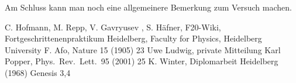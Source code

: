 \documentclass[12pt, a4paper]{article}
\begin{document}
Am Schluss kann man noch eine allgemeinere Bemerkung zum Versuch machen.


\newpage 


\begin{thebibliography}{00}   %
 C. Hofmann, M. Repp, V. Gavryusev , S. H\"afner, F20-Wiki, Fortgeschrittenenpraktikum Heidelberg, Faculty for Physics, Heidelberg University 
 F. Afo, Nature 15 (1905) 23
 Uwe Ludwig, private Mitteilung
 Karl Popper, Phys.~Rev.~Lett.~95 (2001) 25
 K. Winter, Diplomarbeit Heidelberg (1968)
 Genesis 3,4

\end{thebibliography}
\end{document}
